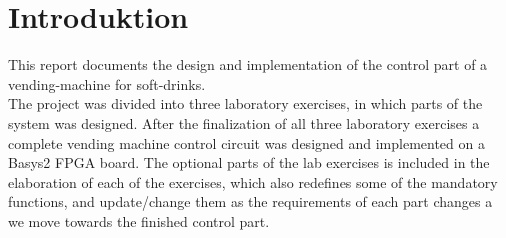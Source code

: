 \chapter{Introduktion}



This report documents the design and implementation of the control part of a vending-machine for soft-drinks. \\

The project was divided into three laboratory exercises, in which parts of the system was designed. After the finalization of all three laboratory exercises a complete vending machine control circuit was designed and implemented on a Basys2 FPGA board. The optional parts of the lab exercises is included in the elaboration of each of the exercises, which also redefines some of the mandatory functions, and update/change them as the requirements of each part changes a we move towards the finished control part. \\